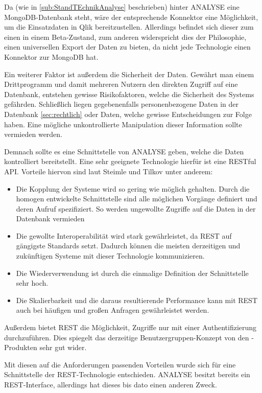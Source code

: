 Da (wie in \ref{sub:StandTEchnikAnalyse} beschrieben) hinter \gls{ANALYSE} eine MongoDB-Datenbank steht, wäre der entsprechende Konnektor eine Möglichkeit, um die Einsatzdaten in Qlik bereitzustellen.
Allerdings befindet sich dieser zum einen in einem Beta-Zustand, zum anderen widerspricht dies der Philosophie, einen universellen Export der Daten zu bieten, da nicht jede Technologie einen Konnektor zur MongoDB hat. 

Ein weiterer Faktor ist außerdem die Sicherheit der Daten.
Gewährt man einem Drittprogramm und damit mehreren Nutzern den direkten Zugriff auf eine Datenbank, entstehen gewisse Risikofaktoren, welche die Sicherheit des Systems gefährden.
Schließlich liegen gegebenenfalls personenbezogene Daten in der Datenbank \ref{sec:rechtlich} oder Daten, welche gewisse Entscheidungen zur Folge haben.
Eine mögliche unkontrollierte Manipulation dieser Information sollte vermieden werden.

Demnach sollte es eine Schnittstelle von \gls{ANALYSE} geben, welche die Daten kontrolliert bereitstellt.
Eine sehr geeignete Technologie hierfür ist eine \gls{REST}ful API.
Vorteile hiervon sind laut Steimle \cite[2.3]{Steimle.2014} und Tilkov \cite[1.1]{Tilkov.2011} unter anderem:
\begin{itemize}
\item Die Kopplung der Systeme wird so gering wie möglich gehalten. 
Durch die homogen entwickelte Schnittstelle sind alle möglichen Vorgänge definiert und deren Aufruf spezifiziert.
So werden ungewollte Zugriffe auf die Daten in der Datenbank vermieden
\item Die gewollte Interoperabilität wird stark gewährleistet, da \gls{REST} auf gängigste Standards setzt. 
Dadurch können die meisten derzeitigen und zukünftigen Systeme mit dieser Technologie kommunizieren.
\item Die Wiederverwendung ist durch die einmalige Definition der Schnittstelle sehr hoch.
\item Die Skalierbarkeit und die daraus resultierende Performance kann mit \gls{REST} auch bei häufigen und großen Anfragen gewährleistet werden.
\end{itemize}

Außerdem bietet \gls{REST} die Möglichkeit, Zugriffe nur mit einer Authentifizierung durchzuführen.
Dies spiegelt das derzeitige Benutzergruppen-Konzept von den \cweb-Produkten sehr gut wider.

Mit diesen auf die Anforderungen passenden Vorteilen wurde sich für eine Schnittstelle der \gls{REST}-Technologie entschieden.
\gls{ANALYSE} besitzt bereits ein \gls{REST}-Interface, allerdings hat dieses bis dato einen anderen Zweck.


